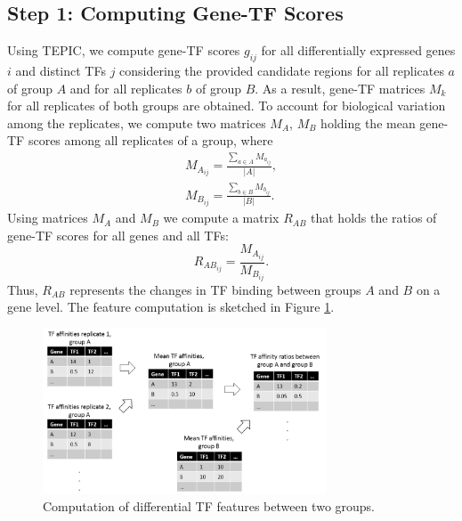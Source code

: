 \documentclass{article}
\begin{document}
\subsection*{Step 1: Computing Gene-TF Scores}
Using TEPIC, we compute gene-TF scores $g_{ij}$ for all differentially expressed genes $i$ and distinct TFs $j$ considering the provided candidate regions for all replicates $a$ of group $A$ and for all replicates $b$ of group $B$. 
As a result, gene-TF matrices $M_k$ for all replicates of both groups are obtained. To account for biological variation among the replicates, we compute two matrices $M_A$, $M_B$ holding the mean gene-TF scores among all replicates of a group, where
\begin{align}
 M_{A_{ij}}= \frac{\sum_{a \in A}{M_{a_{ij}}}}{|A|},
 \\M_{B_{ij}}= \frac{\sum_{b \in B}{M_{b_{ij}}}}{|B|}.
\end{align}
Using matrices $M_A$ and $M_B$ we compute a matrix $R_{AB}$ that holds the ratios of gene-TF scores for all genes and all TFs:
\begin{equation}
    R_{AB_{ij}}=\frac{M_{A_{ij}}}{M_{B_{ij}}}.
\end{equation}
Thus, $R_{AB}$ represents the changes in TF binding between groups $A$ and $B$ on a gene level.
The feature computation is sketched in Figure \ref{TF-Gene-Score_Computation}.
\begin{figure}[h!]
\centering
\includegraphics[width=0.75\textwidth]{TF_Affinities.png}
\caption{Computation of differential TF features between two groups.}
\label{TF-Gene-Score_Computation}
\end{figure}
\end{document}
